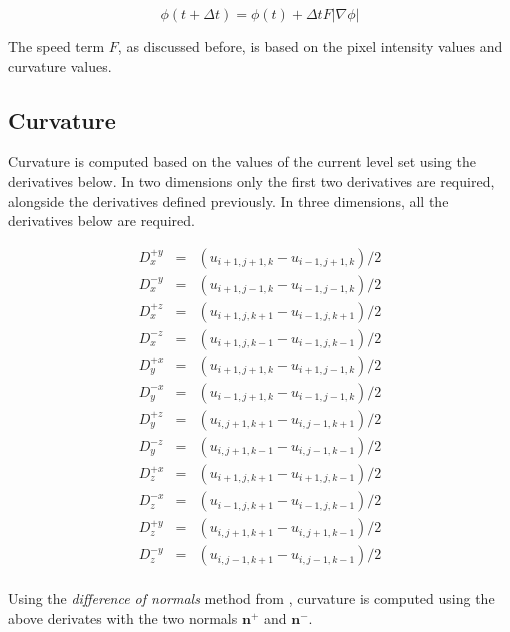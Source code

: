 \begin{equation}
\phi(t+\Delta t) =\phi(t) + \Delta t F|\nabla\phi|
\label{eq:phi}
\end{equation}

The speed term $F$, as discussed before, is based on the pixel intensity values and curvature values. 

\subsection{Curvature}
Curvature is computed based on the values of the current level set using the derivatives below. In two dimensions only the first two derivatives are required, alongside the derivatives defined previously. In three dimensions, all the derivatives below are required.

\begin{eqnarray}
	D_x^{+y} &=& (u_{i+1,j+1,k}-u_{i-1,j+1,k})/2 \nonumber\\
	D_x^{-y} &=& (u_{i+1,j-1,k}-u_{i-1,j-1,k})/2 \nonumber\\
	D_x^{+z} &=& (u_{i+1,j,k+1}-u_{i-1,j,k+1})/2 \nonumber\\
	D_x^{-z} &=& (u_{i+1,j,k-1}-u_{i-1,j,k-1})/2 \nonumber\\
	D_y^{+x} &=& (u_{i+1,j+1,k}-u_{i+1,j-1,k})/2 \nonumber\\
	D_y^{-x} &=& (u_{i-1,j+1,k}-u_{i-1,j-1,k})/2 \nonumber\\
	D_y^{+z} &=& (u_{i,j+1,k+1}-u_{i,j-1,k+1})/2 \nonumber\\
	D_y^{-z} &=& (u_{i,j+1,k-1}-u_{i,j-1,k-1})/2 \nonumber\\
	D_z^{+x} &=& (u_{i+1,j,k+1}-u_{i+1,j,k-1})/2 \nonumber\\
	D_z^{-x} &=& (u_{i-1,j,k+1}-u_{i-1,j,k-1})/2 \nonumber\\
	D_z^{+y} &=& (u_{i,j+1,k+1}-u_{i,j+1,k-1})/2 \nonumber\\
	D_z^{-y} &=& (u_{i,j-1,k+1}-u_{i,j-1,k-1})/2 \nonumber\\
\end{eqnarray}

Using the \textit{difference of normals} method from \cite{Lefohn04astreaming}, curvature is computed using the above derivates with the two normals $\textbf{n}^+$ and $\textbf{n}^-$.

